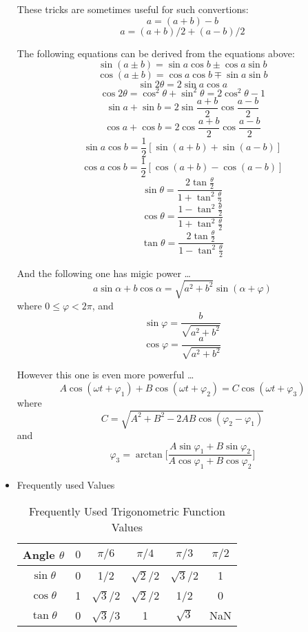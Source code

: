 \begin{itemize}
 These tricks are sometimes useful for such convertions:
  \[ a  = (a+b) - b \]
  \[ a = (a+b)/2 + (a-b)/2 \]

 The following equations can be derived from the equations above:
  \[ \sin (a\pm b) = \sin a \cos b \pm \cos a \sin b \]
  \[ \cos (a\pm b) = \cos a \cos b \mp \sin a \sin b \]
  \[ \sin 2\theta = 2 \sin a \cos a \]
  \[ \cos 2\theta = \cos^2 \theta + \sin^2 \theta = 2\cos^2 \theta -1 \]
  \[ \sin a + \sin b = 2 \sin \frac{a+b}{2} \cos \frac{a-b}{2} \]
  \[ \cos a + \cos b = 2 \cos \frac{a+b}{2} \cos \frac{a-b}{2} \]
  \[ \sin a \cos b = \frac{1}{2} [ \sin (a+b) + \sin (a-b) ] \]
  \[ \cos a \cos b = \frac{1}{2} [ \cos (a+b) - \cos (a-b) ] \]
  \[ \sin \theta =
	\frac{2 \tan \frac{\theta}{2}}{1+\tan^2 \frac{\theta}{2}} \]
  \[ \cos \theta =
	\frac{1-\tan^2 \frac{\theta}{2}}{1+\tan^2 \frac{\theta}{2}} \]
  \[ \tan \theta =
	\frac{2 \tan \frac{\theta}{2}}{1-\tan^2 \frac{\theta}{2}} \]

  And the following one has migic power \ldots
  \[ a \sin \alpha + b \cos \alpha =
	  \sqrt{a^2+b^2} \sin (\alpha + \varphi) \]
  where $0 \leqslant \varphi < 2\pi$, and 
  \[ \sin \varphi = \frac{b}{\sqrt{a^2+b^2}} \]
  \[ \cos \varphi = \frac{a}{\sqrt{a^2+b^2}} \]

  However this one is even more powerful \ldots
  \[ A \cos (\omega t + \varphi_1) + B \cos(\omega t + \varphi_2)
	  = C \cos (\omega t + \varphi_3) \]
  where
  \[ C = \sqrt{A^2 + B^2 - 2AB \cos(\varphi_2 - \varphi_1)} \]
  and \[ \varphi_3 =
	  \arctan \Big[ \frac{A\sin\varphi_1+B\sin\varphi_2}
	  {A\cos\varphi_1+B\cos\varphi_2} \Big]\]

\item{Frequently used Values}\\
\begin{table}[!h]
  \begin{center}
  \begin{tabular}{|c|ccccc|}
  \hline
  Angle $\theta$ & $0$ & $\pi/6$ & $\pi/4$ & $\pi/3$ & $\pi/2$\\
  \hline\hline
  $\sin \theta$  & 0 & 1/2 & $\sqrt{2}$/2 & $\sqrt{3}$/2 & 1 \\
  $\cos \theta$  & 1 & $\sqrt{3}$/2 & $\sqrt{2}$/2 & 1/2 & 0 \\
  $\tan \theta$  & 0 & $\sqrt{3}$/3 & 1 & $\sqrt{3}$   & NaN \\
  \hline
  \end{tabular}
  \caption{Frequently Used Trigonometric Function Values}
  \end{center}
\end{table}

\end{itemize}

